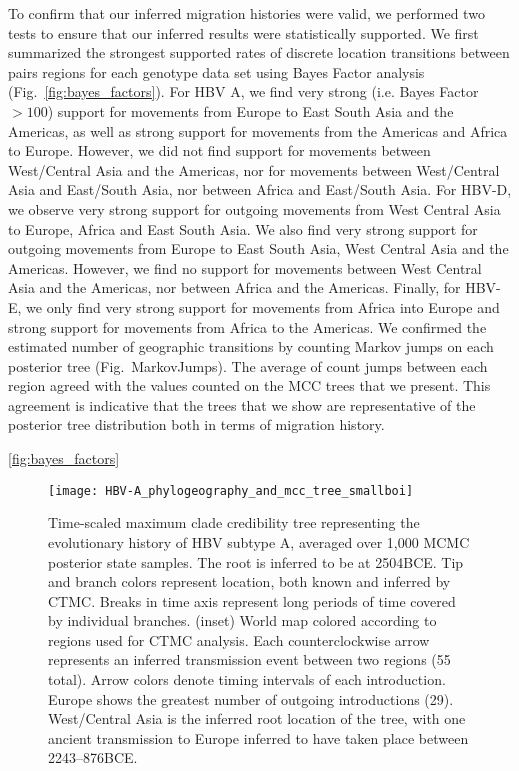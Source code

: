 To confirm that our inferred migration histories were valid, we performed two tests to ensure that our inferred results were statistically supported.
We first summarized the strongest supported rates of discrete location transitions between pairs regions for each genotype data set using Bayes Factor analysis (Fig.~\ref{fig:bayes_factors}).
For HBV A, we find very strong (i.e. Bayes Factor $>100$) support for movements from Europe to East South Asia and the Americas, as well as strong support for movements from the Americas and Africa to Europe.
However, we did not find support for movements between West/Central Asia and the Americas, nor for movements between West/Central Asia and East/South Asia, nor between Africa and East/South Asia.
For HBV-D, we observe very strong support for outgoing movements from West Central Asia to Europe, Africa and East South Asia.
We also find very strong support for outgoing movements from Europe to East South Asia, West Central Asia and the Americas.
However, we find no support for movements between West Central Asia and the Americas, nor between Africa and the Americas.
Finally, for HBV-E, we only find very strong support for movements from Africa into Europe and strong support for movements from Africa to the Americas.
We confirmed the estimated number of geographic transitions by counting Markov jumps on each posterior tree (Fig.~MarkovJumps).
The average of count jumps between each region agreed with the values counted on the MCC trees that we present.
This agreement is indicative that the trees that we show are representative of the posterior tree distribution both in terms of migration history.

\ref{fig:bayes_factors}

\begin{figure}[ht]
  \centering
  \medskip
  \texttt{[image: HBV-A\_phylogeography\_and\_mcc\_tree\_smallboi]}
  \caption[HBV-A phylogeography ]{Time-scaled maximum clade credibility tree representing the evolutionary history of HBV subtype A, averaged over 1,000 MCMC posterior state samples. The root is inferred to be at 2504BCE. Tip and branch colors represent location, both known and inferred by CTMC. Breaks in time axis represent long periods of time covered by individual branches. (inset) World map colored according to regions used for CTMC analysis. Each counterclockwise arrow represents an inferred transmission event between two regions (55 total). Arrow colors denote timing intervals of each introduction. Europe shows the greatest number of outgoing introductions (29). West/Central Asia is the inferred root location of the tree, with one ancient transmission to Europe inferred to have taken place between 2243--876BCE.}
  \label{fig:HBV-A_phylogeo}
\end{figure}


